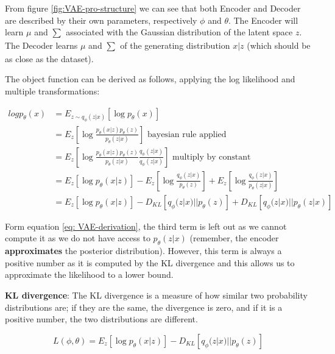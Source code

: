 From figure \ref{fig:VAE-pro-structure} we can see that both Encoder and Decoder are described by their own parameters, respectively $\phi$ and $\theta$. The Encoder will learn $\mu$ and $\sum_{}$ associated with the Gaussian distribution of the latent space $z$. The Decoder learns $\mu$ and $\sum_{}$ of the generating distribution $x|z$ (which should be as close as the dataset).



The object function can be derived as follows, applying the log likelihood and multiple transformations:


\begin{equation} \label{eq: VAE-derivation}
\begin{aligned}
log p_{\theta}(x) &= E_{z \sim q_{\phi}(z|x)}\left[ \log p_{\theta}(x) \right]\\
&=E_{z }\left[ \log \frac{p_{\theta}(x|z) p_{\theta}(z)}{p_{\theta}(z|x)} \right]  \text{  bayesian rule applied} \\
&=E_{z }\left[ \log \frac{p_{\theta}(x|z) p_{\theta}(z)}{p_{\theta}(z|x)} \frac{q_{\phi}(z|x) }{q_{\phi}(z|x)}\right] \text{  multiply by constant} \\
&=E_{z }\left[ \log p_{\theta}(x|z) \right] - E_{z} \left[ \log \frac{q_{\phi}(z|x)}{ p_{\theta}(z)}\right] + E_{z} \left[ \log \frac{q_{\phi}(z|x)}{p_{\theta}(z|x)} \right] \\
&=E_{z }\left[ \log p_{\theta}(x|z) \right] - D_{KL} \left[ q_{\phi}(z|x)|| p_{\theta}(z)\right] + D_{KL} \left[ q_{\phi}(z|x)||p_{\theta}(z|x) \right] 
\end{aligned}
\end{equation}


Form equation \ref{eq: VAE-derivation}, the third term is left out as we cannot compute it as we do not have access to $p_{\theta}(z|x)$ (remember, the encoder \textbf{approximates} the posterior distribution). However, this term is always a positive number as it is computed by the KL divergence and this allows us to approximate the likelihood to a lower bound.

\textbf{KL divergence}: The KL divergence is a measure of how similar two probability distributions are; if they are the same, the divergence is zero, and if it is a positive number, the two distributions are different. 

\begin{equation}
    L(\phi, \theta) = E_{z }\left[ \log p_{\theta}(x|z) \right] - D_{KL} \left[ q_{\phi}(z|x)|| p_{\theta}(z)\right]
\end{equation}

